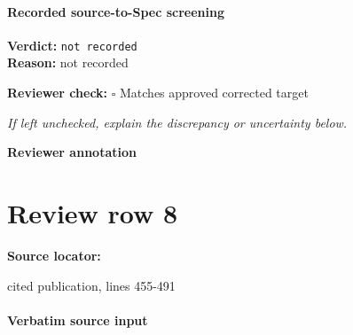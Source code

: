 \documentclass[10pt]{article}
\newcommand{\reviewerbox}{%
  \par\noindent\fbox{\parbox{0.96\linewidth}{\rule{0pt}{0.38in}}}\par
}
\newcommand{\reviewmatch}[1]{%
  \par\noindent\textbf{Reviewer check:} $\square$\; #1\par
  \noindent\emph{If left unchecked, explain the discrepancy or uncertainty below.}\par
}
\begin{document}
\paragraph{Recorded source-to-Spec screening}
\textbf{Verdict:} \texttt{not recorded}
\\
\textbf{Reason:} not recorded
\reviewmatch{Matches approved corrected target}
\noindent\textbf{Reviewer annotation}\par
\reviewerbox
\clearpage
\hypertarget{source-claim-7d055230dc3ae301}{}
\section*{Review row 8}
\textbf{Source locator:} {\footnotesize\raggedright cited publication, lines 455-\allowbreak{}491\par}
\paragraph{Verbatim source input}
\end{document}

